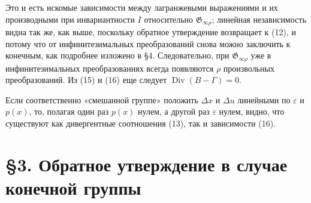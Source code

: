 \documentclass[11pt]{article}
\providecommand{\G}{\mathfrak G}
\providecommand{\eps}{\varepsilon}
\providecommand{\D}{\Delta}
\DeclareMathOperator{\Div}{Div}
\begin{document}
Это и есть искомые зависимости между лагранжевыми выражениями и их производными при инвариантности \(I\) относительно \(\G_{\infty\rho}\); линейная независимость видна так же, как выше, поскольку обратное утверждение возвращает к (12), и потому что от инфинитезимальных преобразований снова можно заключить к конечным, как подробнее изложено в \S{}4. Следовательно, при \(\G_{\infty\rho}\) уже в инфинитезимальных преобразованиях всегда появляются \(\rho\) произвольных преобразований. Из (15) и (16) еще следует \(\Div(B-\Gamma)=0\).

Если соответственно «смешанной группе» положить \(\D x\) и \(\D u\) линейными по \(\eps\) и \(p(x)\), то, полагая один раз \(p(x)\) нулем, а другой раз \(\eps\) нулем, видно, что существуют как дивергентные соотношения (13), так и зависимости (16).

\section*{\S{}3. Обратное утверждение в случае конечной группы}
\end{document}
